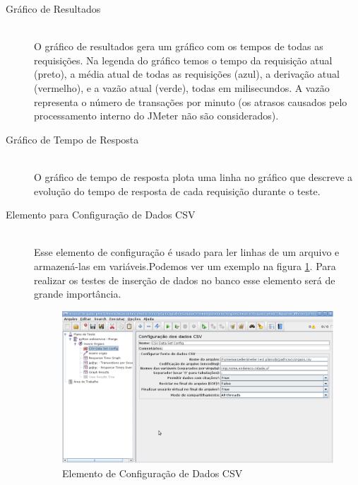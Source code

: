 \begin{description}
\item[Gráfico de Resultados] \hfill \\

O gráfico de resultados gera um gráfico com os tempos de todas as requisições. Na legenda do gráfico temos o tempo da requisição atual (preto), a média atual de todas as requisições (azul), a derivação atual (vermelho), e a vazão atual (verde), todas em milisecundos. A vazão representa o número de transações por minuto (os atrasos causados pelo processamento interno do JMeter não são considerados).

\item[Gráfico de Tempo de Resposta] \hfill \\

O gráfico de tempo de resposta plota uma linha no gráfico que descreve a evolução do tempo de resposta de cada requisição durante o teste.
\end{description}



\begin{description}
\item[Elemento para Configuração de Dados CSV] \hfill \\

Esse elemento de configuração é usado para ler linhas de um arquivo e armazená-las em variáveis.Podemos ver um exemplo na figura \ref{fig:configuracao_csv}. Para realizar os testes de inserção de dados no banco esse elemento será de grande importância.

	\begin{figure}[!htbp]
		\begin{center}
			\includegraphics[width=1\textwidth]{configuracao_csv}
		\end{center}
		\caption{Elemento de Configuração de Dados CSV}
		\label{fig:configuracao_csv}
	\end{figure}
	
\end{description}














